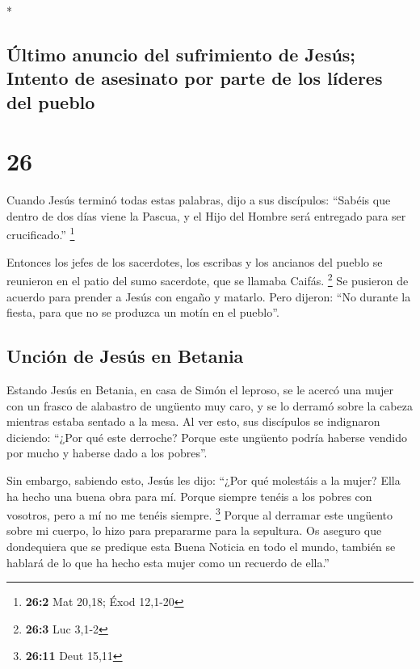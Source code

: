 \begin{paracol}{2}
\begin{otherlanguage}{english}
\end{otherlanguage}

\switchcolumn[0]*

\hypertarget{uxfaltimo-anuncio-del-sufrimiento-de-jesuxfas-intento-de-asesinato-por-parte-de-los-luxedderes-del-pueblo}{%
\subsection{Último anuncio del sufrimiento de Jesús; Intento de
asesinato por parte de los líderes del
pueblo}\label{uxfaltimo-anuncio-del-sufrimiento-de-jesuxfas-intento-de-asesinato-por-parte-de-los-luxedderes-del-pueblo}}

\hypertarget{section-50}{%
\section{26}\label{section-50}}

 Cuando Jesús terminó todas estas palabras, dijo a sus
discípulos:  ``Sabéis que dentro de dos días viene la
Pascua, y el Hijo del Hombre será entregado para ser crucificado.''
\footnote{\textbf{26:2} Mat 20,18; Éxod 12,1-20}

 Entonces los jefes de los sacerdotes, los escribas y los
ancianos del pueblo se reunieron en el patio del sumo sacerdote, que se
llamaba Caifás. \footnote{\textbf{26:3} Luc 3,1-2}  Se
pusieron de acuerdo para prender a Jesús con engaño y matarlo.
 Pero dijeron: ``No durante la fiesta, para que no se
produzca un motín en el pueblo''.

\hypertarget{unciuxf3n-de-jesuxfas-en-betania}{%
\subsection{Unción de Jesús en
Betania}\label{unciuxf3n-de-jesuxfas-en-betania}}

 Estando Jesús en Betania, en casa de Simón el leproso,
 se le acercó una mujer con un frasco de alabastro de
ungüento muy caro, y se lo derramó sobre la cabeza mientras estaba
sentado a la mesa.  Al ver esto, sus discípulos se
indignaron diciendo: ``¿Por qué este derroche?  Porque
este ungüento podría haberse vendido por mucho y haberse dado a los
pobres''.

 Sin embargo, sabiendo esto, Jesús les dijo: ``¿Por qué
molestáis a la mujer? Ella ha hecho una buena obra para mí.
 Porque siempre tenéis a los pobres con vosotros, pero a
mí no me tenéis siempre. \footnote{\textbf{26:11} Deut 15,11}
 Porque al derramar este ungüento sobre mi cuerpo, lo
hizo para prepararme para la sepultura.  Os aseguro que
dondequiera que se predique esta Buena Noticia en todo el mundo, también
se hablará de lo que ha hecho esta mujer como un recuerdo de ella.''


\end{paracol}
